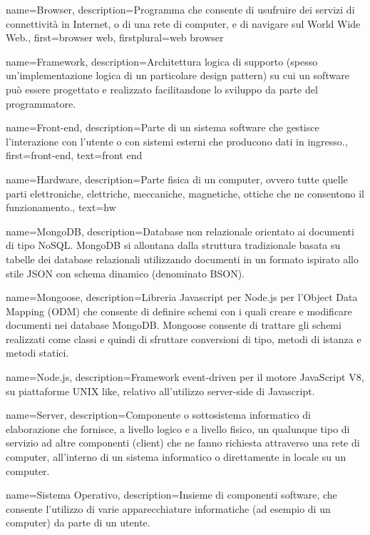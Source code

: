 {
name={Browser},
description={Programma che consente di usufruire dei servizi di connettività in Internet, o di una rete di computer, e di navigare sul World Wide Web.},
first={browser web},
firstplural={web browser}
}


{
name={Framework},
description={Architettura logica di supporto (spesso un'implementazione logica di un particolare design pattern) su cui un software può essere progettato e realizzato facilitandone lo sviluppo da parte del programmatore.}
}

{
name={Front-end},
description={Parte di un sistema software che gestisce l'interazione con l'utente o con sistemi esterni che producono dati in ingresso.},
first={front-end},
text={front end}
}

{
name={Hardware},
description={Parte fisica di un computer, ovvero tutte quelle parti elettroniche, elettriche, meccaniche, magnetiche, ottiche che ne consentono il funzionamento.},
text={hw}
}

{
name={MongoDB},
description={Database non relazionale orientato ai documenti di tipo NoSQL. MongoDB si allontana dalla struttura tradizionale basata su tabelle dei database relazionali utilizzando documenti in un formato ispirato allo stile JSON con schema dinamico (denominato BSON).
}
}

{
name={Mongoose},
description={Libreria Javascript per Node.js per l’Object Data Mapping (ODM) che consente di definire schemi con i quali creare e modificare documenti nei database MongoDB. Mongoose consente di trattare gli schemi realizzati come classi e quindi di sfruttare conversioni di tipo, metodi di istanza e metodi statici.}
}

{
name={Node.js},
description={Framework event-driven per il motore JavaScript V8, su piattaforme UNIX like, relativo all'utilizzo server-side di Javascript.}
}

{
name={Server},
description={Componente o sottosistema informatico di elaborazione che fornisce, a livello logico e a livello fisico, un qualunque tipo di servizio ad altre componenti (client) che ne fanno richiesta attraverso una rete di computer, all'interno di un sistema informatico o direttamente in locale su un computer.}
}

{
name={Sistema Operativo},
description={Insieme di componenti software, che consente l'utilizzo di varie apparecchiature informatiche (ad esempio di un computer) da parte di un utente.}
}